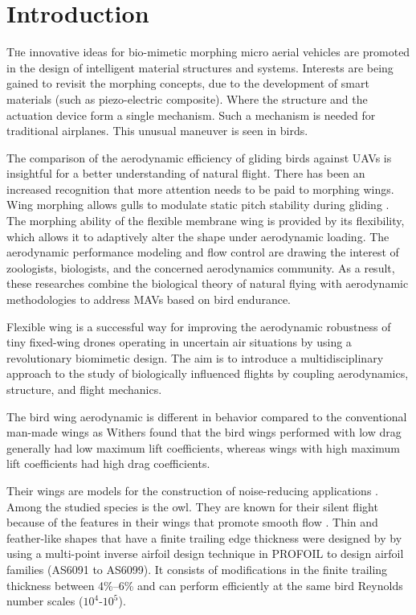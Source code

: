 \documentclass[conf]{new-aiaa}
\begin{document}
\section{Introduction}
\lettrine{T}he innovative ideas for bio-mimetic morphing micro aerial vehicles are promoted in the design of intelligent material structures and systems.
%
Interests are being gained to revisit the morphing concepts, due to the development of smart materials (such as piezo-electric composite).
%
Where the structure and the actuation device form a single mechanism.
%
Such a mechanism is needed for traditional airplanes. This unusual maneuver is seen in birds.

The comparison of the aerodynamic efficiency of gliding birds against UAVs is insightful for a better understanding of natural flight.
%
There has been an increased recognition that more attention needs to be paid to morphing wings. Wing morphing allows gulls to modulate static pitch stability during gliding \cite{Harvey2022GullMorphing}.
%
The morphing ability of the flexible membrane wing is provided by its flexibility, which allows it to adaptively alter the shape under aerodynamic loading.
%
The aerodynamic performance modeling and flow control are drawing the interest of zoologists, biologists, and the concerned aerodynamics community.
%
As a result, these researches combine the biological theory of natural flying with aerodynamic methodologies to address MAVs based on bird endurance.

Flexible wing is a successful way for improving the aerodynamic robustness of tiny fixed-wing drones operating in uncertain air situations by using a revolutionary biomimetic design.
%
The aim is to introduce a multidisciplinary approach to the study of biologically influenced flights by coupling aerodynamics, structure, and flight mechanics.
%

The bird wing aerodynamic is different in behavior compared to the conventional man-made wings as Withers \cite{Withers1981} found that the bird wings performed with low drag generally had low maximum lift coefficients, whereas wings with high maximum lift coefficients had high drag coefficients.

Their wings are models for the construction of noise-reducing applications \cite{Bachmann2010}.
%
Among the studied species is the owl. They are known for their silent flight because of the features in their wings that promote smooth flow \cite{jaworski2020,geyer2016}.
%
Thin and feather-like shapes that have a finite trailing edge thickness were designed by \citet{ananda2018aerodynamic} by using a multi-point inverse airfoil design technique in PROFOIL \cite{AirfoilDesignSoftwarefortheWeb} to design airfoil families (AS6091 to AS6099).
%
It consists of modifications in the finite trailing thickness between 4\%–6\% and can perform efficiently at the same bird Reynolds number scales ($10^4$-$10^5$).
\end{document}
